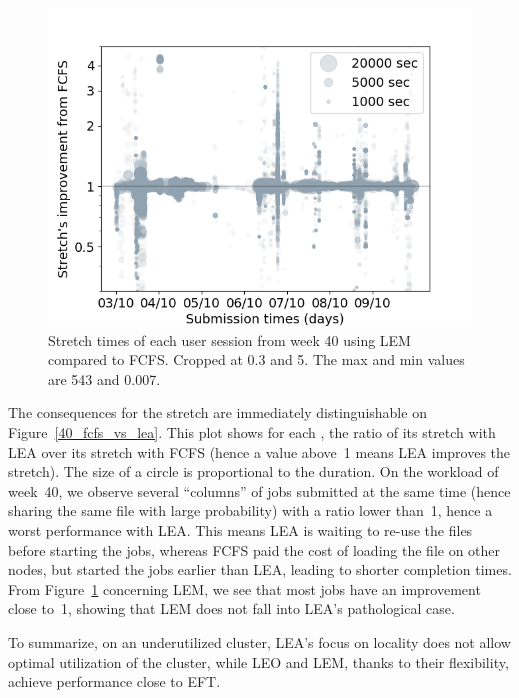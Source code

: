 \documentclass[sigconf,review,anonymous]{acmart}
\newcommand{\rev}[1]{{\color{black}{#1}}}
\newcommand{\us}{\ensuremath{\mathit{user~session}}\xspace}
\begin{document}
\begin{figure}[t]\centering\includegraphics[width=0.9\linewidth]{../MBSS/plot/Stretch_times/Stretch_times_FCFS_LEM_2022-10-03->2022-10-09_V10000_anonymous_450_128_32_256_4_1024.png}\caption{Stretch times of each user session from week 40 using LEM compared to FCFS. Cropped at 0.3 and 5. The max and min values are 543 and 0.007.}\label{40_fcfs_vs_lem}\end{figure}
The consequences for the stretch are immediately distinguishable on Figure~\ref{40_fcfs_vs_lea}.
This plot shows for each \rev{\us}, the ratio of its stretch with LEA over its stretch with FCFS (hence a value above~1 means LEA improves the stretch).
The size of a circle is proportional to the \rev{\us's} duration.
On the workload of week~40, we observe several ``columns'' of jobs submitted at the same time (hence sharing the same file with large probability)
with a ratio lower than~1, hence a worst performance with LEA.
This means LEA is waiting to re-use the files before starting the jobs,
whereas FCFS paid the cost of loading the file on other nodes, but started the jobs
earlier than LEA, leading to shorter completion times.
From Figure~\ref{40_fcfs_vs_lem} concerning LEM, we see that most jobs have an improvement close to~1, showing 
that LEM does not fall into LEA's pathological case.

To summarize, on an underutilized cluster, LEA's focus on locality
does not allow optimal utilization of the cluster, while LEO and LEM, thanks
to their flexibility, achieve performance close to EFT.
\end{document}
